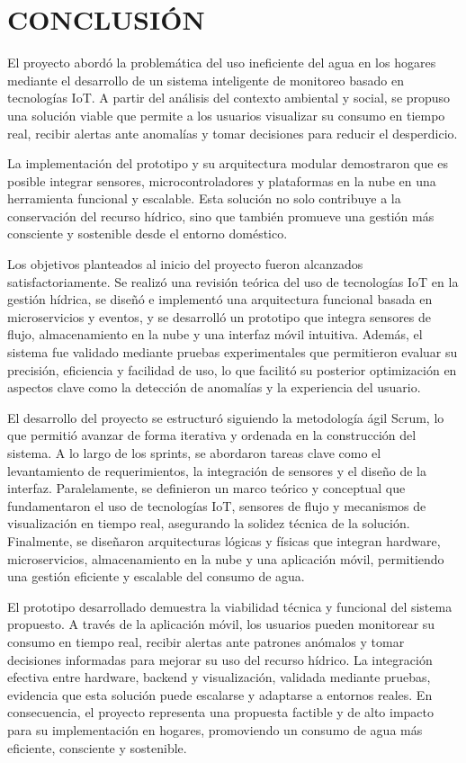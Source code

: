 \documentclass[conference]{IEEEtran}
\begin{document}
\newpage

\section{CONCLUSIÓN}

El proyecto abordó la problemática del uso ineficiente del agua en los hogares mediante el desarrollo de un sistema inteligente de monitoreo basado en tecnologías IoT. A partir del análisis del contexto ambiental y social, se propuso una solución viable que permite a los usuarios visualizar su consumo en tiempo real, recibir alertas ante anomalías y tomar decisiones para reducir el desperdicio.

La implementación del prototipo y su arquitectura modular demostraron que es posible integrar sensores, microcontroladores y plataformas en la nube en una herramienta funcional y escalable. Esta solución no solo contribuye a la conservación del recurso hídrico, sino que también promueve una gestión más consciente y sostenible desde el entorno doméstico.

Los objetivos planteados al inicio del proyecto fueron alcanzados satisfactoriamente. Se realizó una revisión teórica del uso de tecnologías IoT en la gestión hídrica, se diseñó e implementó una arquitectura funcional basada en microservicios y eventos, y se desarrolló un prototipo que integra sensores de flujo, almacenamiento en la nube y una interfaz móvil intuitiva. Además, el sistema fue validado mediante pruebas experimentales que permitieron evaluar su precisión, eficiencia y facilidad de uso, lo que facilitó su posterior optimización en aspectos clave como la detección de anomalías y la experiencia del usuario.

El desarrollo del proyecto se estructuró siguiendo la metodología ágil Scrum, lo que permitió avanzar de forma iterativa y ordenada en la construcción del sistema. A lo largo de los sprints, se abordaron tareas clave como el levantamiento de requerimientos, la integración de sensores y el diseño de la interfaz. Paralelamente, se definieron un marco teórico y conceptual que fundamentaron el uso de tecnologías IoT, sensores de flujo y mecanismos de visualización en tiempo real, asegurando la solidez técnica de la solución. Finalmente, se diseñaron arquitecturas lógicas y físicas que integran hardware, microservicios, almacenamiento en la nube y una aplicación móvil, permitiendo una gestión eficiente y escalable del consumo de agua.

El prototipo desarrollado demuestra la viabilidad técnica y funcional del sistema propuesto. A través de la aplicación móvil, los usuarios pueden monitorear su consumo en tiempo real, recibir alertas ante patrones anómalos y tomar decisiones informadas para mejorar su uso del recurso hídrico. La integración efectiva entre hardware, backend y visualización, validada mediante pruebas, evidencia que esta solución puede escalarse y adaptarse a entornos reales. En consecuencia, el proyecto representa una propuesta factible y de alto impacto para su implementación en hogares, promoviendo un consumo de agua más eficiente, consciente y sostenible.
\end{document}
